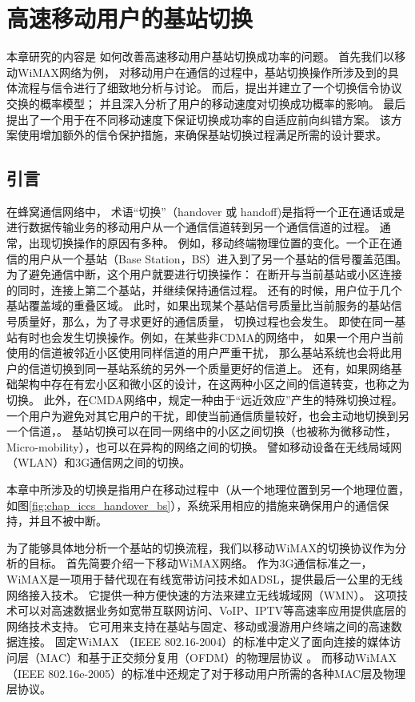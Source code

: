 \graphicspath{ {../body/handover_figures/}}
\chapter{高速移动用户的基站切换}
\label{chap_iccs_handover_alogrithm}
本章研究的内容是
如何改善高速移动用户基站切换成功率的问题。
首先我们以移动WiMAX网络为例，
对移动用户在通信的过程中，基站切换操作所涉及到的具体流程与信令进行了细致地分析与讨论。
而后，提出并建立了一个切换信令协议交换的概率模型；
并且深入分析了用户的移动速度对切换成功概率的影响。
最后提出了一个用于在不同移动速度下保证切换成功率的自适应前向纠错方案。
该方案使用增加额外的信令保护措施，来确保基站切换过程满足所需的设计要求。


\section{引言}
\label{section_iccs_handover_algorithm_introduction}
在蜂窝通信网络中，
术语“切换”（handover 或 handoff)是指将一个正在通话或是进行数据传输业务的移动用户从一个通信信道转到另一个通信信道的过程。
通常，出现切换操作的原因有多种。
例如，移动终端物理位置的变化。一个正在通信的用户从一个基站（Base Station，BS）进入到了另一个基站的信号覆盖范围。
为了避免通信中断，这个用户就要进行切换操作：
在断开与当前基站或小区连接的同时，连接上第二个基站，并继续保持通信过程。
还有的时候，用户位于几个基站覆盖域的重叠区域。
此时，如果出现某个基站信号质量比当前服务的基站信号质量好，那么，为了寻求更好的通信质量，
切换过程也会发生。
即使在同一基站有时也会发生切换操作。例如，在某些非CDMA的网络中，
如果一个用户当前使用的信道被邻近小区使用同样信道的用户严重干扰，
那么基站系统也会将此用户的信道切换到同一基站系统的另外一个质量更好的信道上。
还有，如果网络基础架构中存在有宏小区和微小区的设计，在这两种小区之间的信道转变，也称之为切换。
此外，在CMDA网络中，规定一种由于“远近效应”产生的特殊切换过程。
一个用户为避免对其它用户的干扰，即使当前通信质量较好，也会主动地切换到另一个信道，。
基站切换可以在同一网络中的小区之间切换（也被称为微移动性，Micro-mobility），也可以在异构的网络之间的切换。
譬如移动设备在无线局域网（WLAN）和3G通信网之间的切换。

本章中所涉及的切换是指用户在移动过程中（从一个地理位置到另一个地理位置，如图\ref{fig:chap_iccs_handover_bs}），系统采用相应的措施来确保用户的通信保持，并且不被中断\cite{Pollini:1996:THD}\cite{Wright:ICMB2007}。

为了能够具体地分析一个基站的切换流程，我们以移动WiMAX的切换协议作为分析的目标。
首先简要介绍一下移动WiMAX网络。
作为3G通信标准之一，WiMAX是一项用于替代现在有线宽带访问技术如ADSL，提供最后一公里的无线网络接入技术。
它提供一种方便快速的方法来建立无线城域网（WMN）。
这项技术可以对高速数据业务如宽带互联网访问、VoIP、IPTV等高速率应用提供底层的网络技术支持。
它可用来支持在基站与固定、移动或漫游用户终端之间的高速数据连接。
固定WiMAX （IEEE 802.16-2004）的标准中定义了面向连接的媒体访问层（MAC）和基于正交频分复用（OFDM）的物理层协议 \cite{IEEE:802_16D:2005}。
而移动WiMAX（IEEE 802.16e-2005）的标准中还规定了对于移动用户所需的各种MAC层及物理层协议\cite{IEEE:802_16E:2006}。


